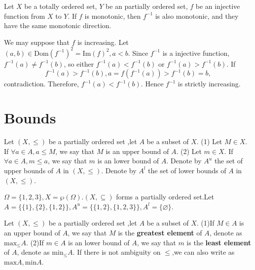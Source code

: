 \documentclass{book}
\numberwithin{equation}{section}
\begin{document}
\begin{propositionenv}
    Let $X$ be a totally ordered set, $Y$ be an partially ordered set, $f$ be an injective function from $X$ to $Y$. If $f$ is monotonic, then $f^{-1}$ is also monotonic, and they have the same monotonic direction.
\end{propositionenv}
\begin{proofenv}
    We may suppose that $f$ is increasing.
    Let $(a,b)\in \mathrm{Dom}(f^{-1})^2=\mathrm{Im}(f)^2,a<b$. Since $f^{-1}$ is a injective function, $f^{-1}(a)\not =f^{-1}(b)$, so either $f^{-1}(a)<f^{-1}(b)$ or $f^{-1}(a)>f^{-1}(b)$. If $$f^{-1}(a)>f^{-1}(b),a=f(f^{-1}(a))>f^{-1}(b)=b,$$ contradiction. Therefore, $f^{-1}(a)<f^{-1}(b)$. Hence $f^{-1}$ is strictly increasing.
\end{proofenv}
\section{Bounds}
\begin{definitionenv}
    Let $(X,\le)$ be a partially ordered set ,let $A$ be a subset of $X$.
    \newline
    (1) Let $M\in X$. If $\forall a \in A ,a\le M$, we say that $M$ is an upper bound of $A$. 
    \newline
    (2) Let $m\in X$. If $\forall a \in A ,m\le a$, we say that $m$ is an lower bound of $A$. 
    \newline
    Denote by $A^u$ the set of upper bounds of $A$ in $(X,\le)$.
    \newline
     Denote by $A^l$ the set of lower bounds of $A$ in $(X,\le)$.

\end{definitionenv}
\begin{exampleenv}
    $\Omega=\{1,2,3\},X=\wp (\Omega).(X,\subseteq)$ forms a partially ordered set.Let $A=\{\{1\},\{2\},\{1,2\}\},A^u=\{\{1,2\},\{1,2,3\}\},A^l=\{\varnothing\}$.
\end{exampleenv}
\begin{definitionenv}
    Let $(X,\le)$ be a partially ordered set ,let $A$ be a subset of $X$.
    \newline
    (1)If $M \in A$ is an upper bound of $A$, we say that $M$ is the \textbf{greatest element} of $A$, denote as $\mathrm{max}_\le A$.
    \newline
    (2)If $m \in A$ is an lower bound of $A$, we say that $m$ is the \textbf{least element} of $A$, denote as $\mathrm{min}_\le A$.
    \newline
    If there is not ambiguity on $\le$,we can also write as $\mathrm{max}A,\mathrm{min}A$.
\end{definitionenv}
\end{document}
